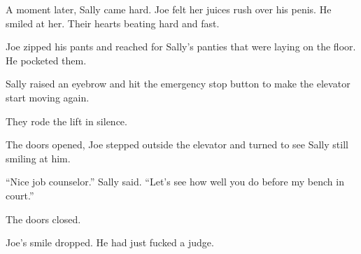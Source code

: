 A moment later, Sally came hard. Joe felt her juices rush over his penis. He smiled at her. Their hearts beating hard and fast.

Joe zipped his pants and reached for Sally’s panties that were laying on the floor. He pocketed them.

Sally raised an eyebrow and hit the emergency stop button to make the elevator start moving again.

They rode the lift in silence.

The doors opened, Joe stepped outside the elevator and turned to see Sally still smiling at him.

“Nice job counselor.” Sally said. “Let’s see how well you do before my bench in court.”

The doors closed.

Joe’s smile dropped. He had just fucked a judge.

